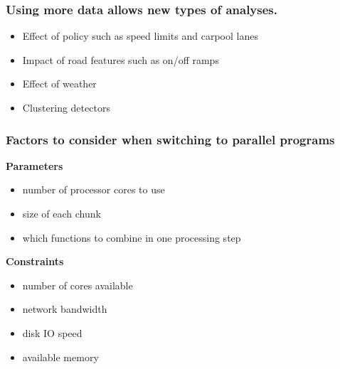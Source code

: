 \documentclass{beamer}
\begin{document}
\begin{frame}

    \frametitle{Using more data allows new types of analyses.}


    \begin{itemize}
        \item Effect of policy such as speed limits and carpool lanes
        \item Impact of road features such as on/off ramps
        \item Effect of weather
        \item Clustering detectors
    \end{itemize}


\end{frame}
\begin{frame}

    \frametitle{Factors to consider when switching to parallel programs}


\textbf{Parameters}
\begin{itemize}
    \item number of processor cores to use
    \item size of each chunk
    \item which functions to combine in one processing step
\end{itemize}

\textbf{Constraints}
\begin{itemize}
    \item number of cores available
    \item network bandwidth
    \item disk IO speed
    \item available memory
\end{itemize}

\end{frame}
\end{document}

